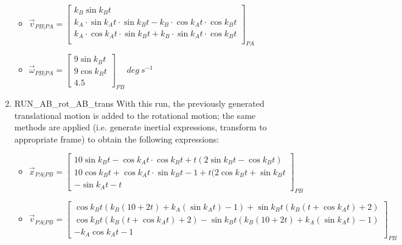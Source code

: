 \begin{description}
\begin{enumerate}
\begin{itemize}
    \item $\vec v_{PB|PA} = \begin{bmatrix} 
              k_B \sin k_B t \\
              k_A \cdot \sin k_A t \cdot \sin k_B t - k_B \cdot \cos k_A t \cdot \cos k_B t\\
              k_A \cdot \cos k_A t \cdot \sin k_B t + k_B \cdot \sin k_A t \cdot \cos k_B t\\ 
           \end{bmatrix}_{PA}$
           
    \item $\vec \omega_{PB|PA} = \begin{bmatrix} 9 \sin k_B t\\
                                               9 \cos k_B t\\
                                               4.5 
                               \end{bmatrix}_{PB}\ deg\ s^{-1}$
   \end{itemize}
  
 \item RUN\_AB\_rot\_AB\_trans  \newline
 With this run, the previously generated translational motion is added to the rotational motion; the same methods are applied (i.e. generate inertial expressions, transform to appropriate frame) to obtain the following expressions:
  \begin{itemize}
    \item $\vec x_{PA|PB} = \begin{bmatrix} 10 \sin k_B t - \cos k_A t \cdot \cos k_B t + t(2 \sin k_B t - \cos k_B t)\\
                                          10 \cos k_B t + \cos k_A t \cdot \sin k_B t - 1 + t(2 \cos k_B t + \sin k_B t \\ 
                                          -\sin k_A t - t
                          \end{bmatrix}
                          _{PB}$
 
    \item $\vec v_{PA|PB} = \begin{bmatrix} 
           \cos k_B t ( k_B (10+2t) + k_A (\sin k_A t) -1 )  + \sin k_B t (k_B(t + \cos k_A t) + 2) \\
           \cos k_B t (k_B(t + \cos k_A t) + 2) - \sin k_B t ( k_B (10+2t) + k_A (\sin k_A t) -1 )  \\ 
            - k_A \cos k_A t -1
           \end{bmatrix}_{PB}$
    

\end{itemize}
\end{enumerate}
\end{description}
